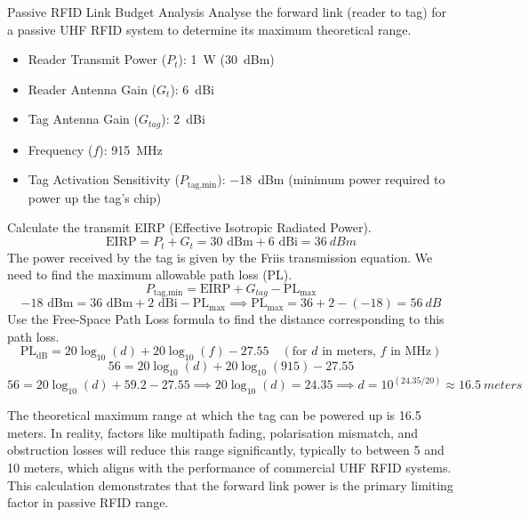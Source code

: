 \begin{workedexample}{Passive RFID Link Budget Analysis}
     Analyse the forward link (reader to tag) for a passive UHF RFID system to determine its maximum theoretical range.
    \begin{itemize}
        \item Reader Transmit Power ($P_t$): \qty{1}{W} (\qty{30}{dBm})
        \item Reader Antenna Gain ($G_t$): \qty{6}{dBi}
        \item Tag Antenna Gain ($G_{tag}$): \qty{2}{dBi}
        \item Frequency ($f$): \qty{915}{MHz}
        \item Tag Activation Sensitivity ($P_{\text{tag,min}}$): \qty{-18}{dBm} (minimum power required to power up the tag's chip)
    \end{itemize}
    \begin{derivationsteps}
        \step Calculate the transmit EIRP (Effective Isotropic Radiated Power).
        \[ \text{EIRP} = P_t + G_t = 30 \text{ dBm} + 6 \text{ dBi} = \qty{36}{dBm} \]
        \step The power received by the tag is given by the Friis transmission equation. We need to find the maximum allowable path loss (PL).
        \[ P_{\text{tag,min}} = \text{EIRP} + G_{tag} - \text{PL}_{\max} \]
        \[ -18 \text{ dBm} = 36 \text{ dBm} + 2 \text{ dBi} - \text{PL}_{\max} \implies \text{PL}_{\max} = 36 + 2 - (-18) = \qty{56}{dB} \]
        \step Use the Free-Space Path Loss formula to find the distance corresponding to this path loss.
        \[ \text{PL}_{\text{dB}} = 20\log_{10}(d) + 20\log_{10}(f) - 27.55 \quad (\text{for } d \text{ in meters, } f \text{ in MHz}) \]
        \[ 56 = 20\log_{10}(d) + 20\log_{10}(915) - 27.55 \]
        \[ 56 = 20\log_{10}(d) + 59.2 - 27.55 \implies 20\log_{10}(d) = 24.35 \implies d = 10^{(24.35/20)} \approx \qty{16.5}{meters} \]
    \end{derivationsteps}
     The theoretical maximum range at which the tag can be powered up is 16.5 meters. In reality, factors like multipath fading, polarisation mismatch, and obstruction losses will reduce this range significantly, typically to between 5 and 10 meters, which aligns with the performance of commercial UHF RFID systems. This calculation demonstrates that the forward link power is the primary limiting factor in passive RFID range.
\end{workedexample}


